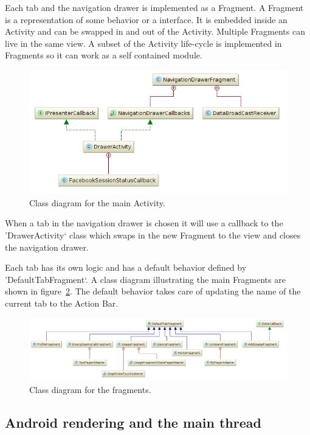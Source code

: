 Each tab and the navigation drawer is implemented as a Fragment. A Fragment is a representation of some behavior or a interface. It is embedded inside an Activity and can be swapped in and out of the Activity. Multiple Fragments can live in the same view. A subset of the Activity life-cycle is implemented in Fragments so it can work as a self contained module. 

\begin{figure}[H]
\includegraphics[width=\textwidth]{ch/architecture/fig/class_diagram_drawer.png}
\caption{Class diagram for the main Activity.}
\label{fig:classDiagramDrawer}
\end{figure}

When a tab in the navigation drawer is chosen it will use a callback to the 'DrawerActivity` class which swaps in the new Fragment to the view and closes the navigation drawer.

Each tab has its own logic and has a default behavior defined by 'DefaultTabFragment`. A class diagram illustrating the main Fragments are shown in figure~\ref{fig:classDiagramFragments}. The default behavior takes care of updating the name of the current tab to the Action Bar.

\begin{figure}[H]
\includegraphics[width=\textwidth]{ch/architecture/fig/class_diagram_fragments.png}
\caption{Class diagram for the fragments.}
\label{fig:classDiagramFragments}
\end{figure}

\subsection{Android rendering and the main thread}

